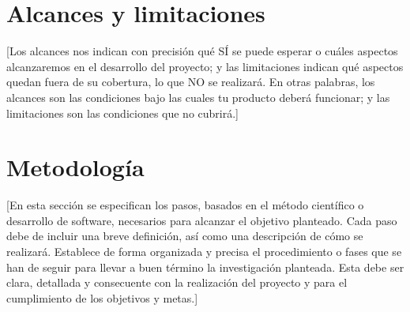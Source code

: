 \section{Alcances y limitaciones}

[Los alcances nos indican con precisión qué SÍ se puede esperar o cuáles aspectos alcanzaremos en el desarrollo del proyecto; y las limitaciones indican qué aspectos quedan fuera de su cobertura, lo que NO se realizará. 
En otras palabras, los alcances son las condiciones bajo las cuales tu producto deberá funcionar; y las limitaciones son las condiciones que no cubrirá.]

\section{Metodología}
[En esta sección se especifican los pasos, basados en el método científico o desarrollo de software, necesarios para alcanzar el objetivo planteado. 
Cada paso debe de incluir una breve definición, así como una descripción de cómo se realizará.
Establece de forma organizada y precisa el procedimiento o fases que se han de seguir para llevar a buen término la investigación planteada. 
Esta debe ser  clara, detallada y consecuente con la realización del proyecto y para el cumplimiento de los objetivos y metas.]

